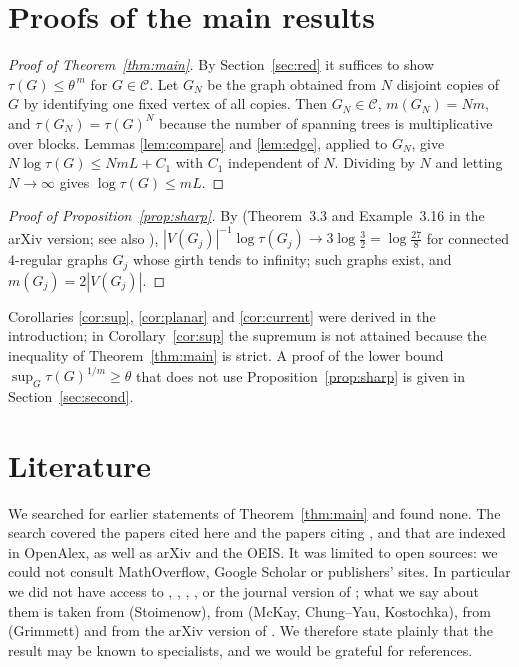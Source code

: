 \documentclass[11pt]{amsart}
\theoremstyle{plain}
\theoremstyle{remark}
\newcommand{\cC}{\mathcal{C}}
\newcommand{\tht}{\theta}
\begin{document}
\section{Proofs of the main results}\label{sec:proof}

\begin{proof}[Proof of Theorem~\ref{thm:main}]
By Section~\ref{sec:red} it suffices to show $\tau(G)\le\tht^{\,m}$ for $G\in\cC$. Let $G_N$ be the graph obtained
from $N$ disjoint copies of $G$ by identifying one fixed vertex of all copies. Then $G_N\in\cC$,
$m(G_N)=Nm$, and $\tau(G_N)=\tau(G)^N$ because the number of spanning trees is multiplicative over blocks.
Lemmas \ref{lem:compare} and \ref{lem:edge}, applied to $G_N$, give $N\log\tau(G)\le NmL+C_1$ with $C_1$ independent
of $N$. Dividing by $N$ and letting $N\to\infty$ gives $\log\tau(G)\le mL$.
\end{proof}

\begin{proof}[Proof of Proposition~\ref{prop:sharp}]
By \cite{Lyons} (Theorem~3.3 and Example~3.16 in the arXiv version; see also \cite{McKay,ChungYau}),
$|V(G_j)|^{-1}\log\tau(G_j)\to3\log\frac32=\log\frac{27}8$
for connected $4$-regular graphs $G_j$ whose girth tends to infinity; such graphs exist, and $m(G_j)=2|V(G_j)|$.
\end{proof}

Corollaries \ref{cor:sup}, \ref{cor:planar} and \ref{cor:current} were derived in the introduction; in
Corollary~\ref{cor:sup} the supremum is not attained because the inequality of Theorem~\ref{thm:main} is strict.
A proof of the lower bound $\sup_G\tau(G)^{1/m}\ge\tht$ that does not use Proposition~\ref{prop:sharp} is given in
Section~\ref{sec:second}.

\section{Literature}\label{sec:lit}

We searched for earlier statements of Theorem~\ref{thm:main} and found none. The search covered the papers cited
here and the papers citing \cite{Kenyon}, \cite{Stoimenow} and \cite{CKP} that are indexed in OpenAlex, as well as
arXiv and the OEIS. It was limited to open sources: we could not consult MathOverflow, Google Scholar or
publishers' sites. In particular we did not have access to \cite{Stoimenow}, \cite{McKay}, \cite{ChungYau},
\cite{Grimmett}, \cite{Kostochka} or the journal version of \cite{Kenyon}; what we say about them is taken from
\cite{CKP,GJKLZ} (Stoimenow), from \cite{GIKM,Lyons} (McKay, Chung--Yau, Kostochka), from \cite{ShrockWu}
(Grimmett) and from the arXiv version of \cite{Kenyon}. We therefore state plainly that the result may be known to
specialists, and we would be grateful for references.
\end{document}

